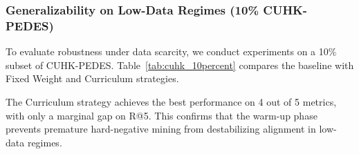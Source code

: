 \documentclass{article}
\begin{document}
\begin{table}[H]
    \centering
    \caption{Comparison on PRW-TPS-CN (Chinese). Best results in bold.}
    \label{tab:sota_cn}
\end{table}

\subsubsection{Generalizability on Low-Data Regimes (10\% CUHK-PEDES)}
To evaluate robustness under data scarcity, we conduct experiments on a 10\% subset of CUHK-PEDES. Table~\ref{tab:cuhk_10percent} compares the baseline with Fixed Weight and Curriculum strategies.

\begin{table}[H]
    \centering
    \caption{Performance comparison on 10\% of the CUHK-PEDES training set. }
    \label{tab:cuhk_10percent}
\end{table}

The Curriculum strategy achieves the best performance on 4 out of 5 metrics, with only a marginal gap on R@5. This confirms that the warm-up phase prevents premature hard-negative mining from destabilizing alignment in low-data regimes.
\end{document}
